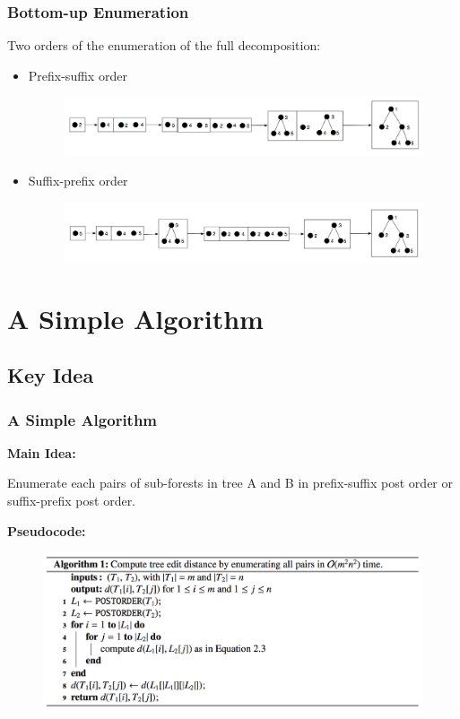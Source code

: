 \documentclass{beamer}
\begin{document}
\begin{frame}
\frametitle{Bottom-up Enumeration}
Two orders of the enumeration of the full decomposition:
\begin{itemize}
\item Prefix-suffix order%
\begin{figure}
	\includegraphics[width=1.0\linewidth]{PrefixSuffix}
	\centering
\end{figure}
\item Suffix-prefix order%
\begin{figure}
	\includegraphics[width=1.0\linewidth]{SuffixPrefix}
	\centering
\end{figure}
\end{itemize}
\end{frame}
\section{A Simple Algorithm}
\subsection{Key Idea}
\begin{frame}
\frametitle{A Simple Algorithm}
\textbf{Main Idea:}

Enumerate each pairs of sub-forests in tree A and B in prefix-suffix post order or suffix-prefix post order.

\textbf{Pseudocode:}
\begin{figure}
	\includegraphics[width=1.0\linewidth]{SimpleAlgorithm}
	\centering
\end{figure}
\end{frame}
\end{document}
